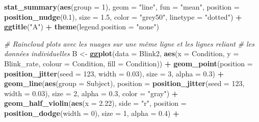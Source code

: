 \documentclass[
  french,
]{book}
\newenvironment{Shaded}{\begin{snugshade}}{\end{snugshade}}
\newcommand{\CommentTok}[1]{\textcolor[rgb]{0.56,0.35,0.01}{\textit{#1}}}
\newcommand{\DataTypeTok}[1]{\textcolor[rgb]{0.13,0.29,0.53}{#1}}
\newcommand{\DecValTok}[1]{\textcolor[rgb]{0.00,0.00,0.81}{#1}}
\newcommand{\FloatTok}[1]{\textcolor[rgb]{0.00,0.00,0.81}{#1}}
\newcommand{\KeywordTok}[1]{\textcolor[rgb]{0.13,0.29,0.53}{\textbf{#1}}}
\newcommand{\NormalTok}[1]{#1}
\newcommand{\OperatorTok}[1]{\textcolor[rgb]{0.81,0.36,0.00}{\textbf{#1}}}
\newcommand{\StringTok}[1]{\textcolor[rgb]{0.31,0.60,0.02}{#1}}
\begin{document}
\begin{Shaded}
\begin{Highlighting}[]
\StringTok{  }\KeywordTok{stat_summary}\NormalTok{(}\KeywordTok{aes}\NormalTok{(}\DataTypeTok{group =} \DecValTok{1}\NormalTok{),}
               \DataTypeTok{geom =} \StringTok{"line"}\NormalTok{,}
               \DataTypeTok{fun =} \StringTok{"mean"}\NormalTok{, }
               \DataTypeTok{position =} \KeywordTok{position_nudge}\NormalTok{(}\FloatTok{0.1}\NormalTok{),}
               \DataTypeTok{size =} \FloatTok{1.5}\NormalTok{, }\DataTypeTok{color =} \StringTok{"grey50"}\NormalTok{,  }\DataTypeTok{linetype =} \StringTok{"dotted"}\NormalTok{) }\OperatorTok{+}
\StringTok{  }\KeywordTok{ggtitle}\NormalTok{(}\StringTok{"A"}\NormalTok{) }\OperatorTok{+}
\StringTok{  }\KeywordTok{theme}\NormalTok{(}\DataTypeTok{legend.position =} \StringTok{"none"}\NormalTok{)}


\CommentTok{# Raincloud plots avec les nuages sur une même ligne et les lignes reliant }
\CommentTok{# les données individuelles}
\NormalTok{B <-}
\StringTok{  }\KeywordTok{ggplot}\NormalTok{(}\DataTypeTok{data =}\NormalTok{ Blink2, }\KeywordTok{aes}\NormalTok{(}\DataTypeTok{x =}\NormalTok{ Condition, }\DataTypeTok{y =}\NormalTok{ Blink_rate, }
                            \DataTypeTok{colour =}\NormalTok{ Condition, }\DataTypeTok{fill =}\NormalTok{ Condition)) }\OperatorTok{+}
\StringTok{  }\KeywordTok{geom_point}\NormalTok{(}\DataTypeTok{position =} \KeywordTok{position_jitter}\NormalTok{(}\DataTypeTok{seed =} \DecValTok{123}\NormalTok{, }\DataTypeTok{width =} \FloatTok{0.03}\NormalTok{),}
             \DataTypeTok{size =} \DecValTok{3}\NormalTok{, }\DataTypeTok{alpha =} \FloatTok{0.3}\NormalTok{) }\OperatorTok{+}\StringTok{ }
\StringTok{  }\KeywordTok{geom_line}\NormalTok{(}\KeywordTok{aes}\NormalTok{(}\DataTypeTok{group =}\NormalTok{ Subject),}
            \DataTypeTok{position =} \KeywordTok{position_jitter}\NormalTok{(}\DataTypeTok{seed =} \DecValTok{123}\NormalTok{, }\DataTypeTok{width =} \FloatTok{0.03}\NormalTok{),}
            \DataTypeTok{size =} \DecValTok{2}\NormalTok{, }\DataTypeTok{alpha =} \FloatTok{0.3}\NormalTok{, }\DataTypeTok{color =} \StringTok{"gray"}\NormalTok{) }\OperatorTok{+}\StringTok{ }
\StringTok{  }\KeywordTok{geom_half_violin}\NormalTok{(}\KeywordTok{aes}\NormalTok{(}\DataTypeTok{x =} \FloatTok{2.22}\NormalTok{),}
                   \DataTypeTok{side =} \StringTok{"r"}\NormalTok{,}
                   \DataTypeTok{position =} \KeywordTok{position_dodge}\NormalTok{(}\DataTypeTok{width =} \DecValTok{0}\NormalTok{),}
                   \DataTypeTok{size =} \DecValTok{1}\NormalTok{, }\DataTypeTok{alpha =} \FloatTok{0.4}\NormalTok{) }\OperatorTok{+}\StringTok{  }

\end{Highlighting}
\end{Shaded}
\end{document}
